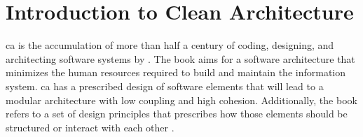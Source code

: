 \section{Introduction to Clean Architecture} \label{sec_into_ca}

\gls{ca} is the accumulation of more than half a century of coding, designing, and
architecting software systems by \citeauthor*[]{robert_c_martin_clean_2018}. The book aims
for a software architecture that minimizes the human resources required to build and
maintain the information system. \gls{ca} has a prescribed design of software elements
that will lead to a modular architecture with low coupling and high cohesion.
Additionally, the book refers to a set of design principles that prescribes how those
elements should be structured or interact with each other
\parencite{robert_c_martin_clean_2018}.
